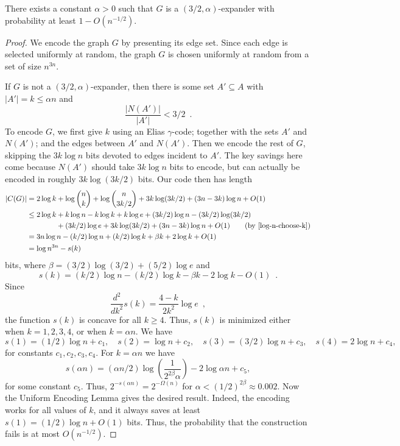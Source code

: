 \documentclass[format=acmsmall, review=false, screen=true]{acmart}
\begin{document}
\begin{thm}
  There exists a constant $\alpha >0$ such that $G$ is a
  $(3/2,\alpha)$-expander with probability at least $1 - O(n^{-1/2})$.
\end{thm}

\begin{proof}
  We encode the graph $G$ by presenting its edge set. Since each edge
  is selected uniformly at random, the graph $G$ is chosen uniformly at
  random from a set of size $n^{3n}$.
  
  If $G$ is not a $(3/2, \alpha)$-expander, then there is some set $A'
  \subseteq A$ with $|A'|=k\le \alpha n$ and
  \[
  \frac{|N(A')|}{|A'|} < 3/2 \enspace .
  \]
  To encode $G$, we first give $k$ using an Elias $\gamma$-code; together 
  with the sets $A'$ and $N(A')$; and the edges between $A'$ and
  $N(A')$. Then we encode the rest of $G$, skipping the $3k\log n$
  bits devoted to edges incident to $A'$.  The key savings here come 
  because
  $N(A')$ should take $3k\log n$ bits to encode, but can actually be
  encoded in roughly $3k\log(3k/2)$ bits. Our code then has length
  \begin{align*}
    |C(G)| &= 2\log k + \log {n \choose k} + \log {n \choose 3k/2} + 3k \log (3k/2) + (3n - 3k) \log n + O(1) \\
           &\le 2\log k + k\log n - k\log k + k\log e + (3k/2)\log n - (3k/2) \log (3k/2) \\
           & \hphantom{{}=2\log k} + (3k/2) \log e + 3k \log (3k/2) + (3n - 3k) \log n + O(1) \tag{by \eqref{log-n-choose-k}} \\
           &= 3n\log n - (k/2)\log n + (k/2)\log k + \beta k + 2\log k + O(1) \\
           &= \log n^{3n} - s(k)
  \end{align*}
  bits, where $\beta = (3/2) \log (3/2) + (5/2) \log e$ and
  \[
  s(k) = (k/2)\log n - (k/2)\log k - \beta k -
  2 \log k - O(1) \enspace.
  \]
  Since
  \[
    \frac{d^2}{dk^2} s(k) = \frac{4 - k}{2 k^2} \log e \enspace ,
  \]
  the function $s(k)$ is concave for all $k \geq 4$. Thus, $s(k)$ is
  minimized either when $k = 1, 2, 3, 4$, or when $k = \alpha n$. We have
  \[
    s(1) = (1/2)\log n + c_1,  \quad
    s(2) = \log n + c_2, \quad
    s(3) = (3/2) \log n + c_3, \quad 
    s(4) = 2 \log n + c_4, 
  \]
  for constants $c_1, c_2, c_3, c_4$. For $k=\alpha n$ we have
  \[
    s(\alpha n) = (\alpha n/2)\log \left(\frac{1}{2^{2\beta}
        \alpha}\right) - 2 \log \alpha n + c_5,
  \]
  for some constant $c_5$.
  Thus, $2^{-s(\alpha n)} = 2^{-\varOmega(n)}$ for
  $\alpha < (1/2)^{2\beta} \approx 0.002$. Now the Uniform Encoding
  Lemma gives the desired result. Indeed, the encoding works
  for all values of $k$, and it always saves at least 
  $s(1) = (1/2)\log n + O(1)$ bits.
  Thus, the probability that the construction fails is
  at most $O(n^{-1/2})$.
\end{proof}
\end{document}
